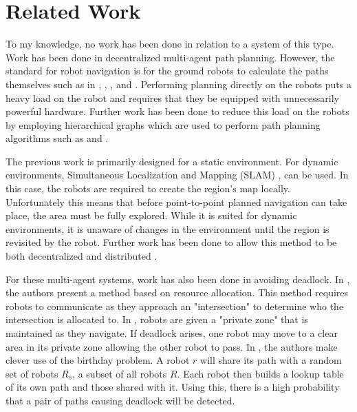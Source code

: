 \section{Related Work}
To my knowledge, no work has been done in relation to a system of this type. Work has been done in decentralized multi-agent path planning. However, the standard for robot navigation is for the ground robots to calculate the paths themselves such as in \cite{DeadlockDigani}, \cite{DeadlockDraganjac}, \cite{FTC-A}, and \cite{DecentralizedPlanningVelagapudi}. Performing planning directly on the robots puts a heavy load on the robot and requires that they be equipped with unnecessarily powerful hardware. Further work has been done to reduce this load on the robots by employing hierarchical graphs which are used to perform path planning algorithms such as \cite{FTC-A} and \cite{CTF-A}. 

The previous work is primarily designed for a static environment. For dynamic environments, Simultaneous Localization and Mapping (SLAM) \cite{SLAM}, can be used. In this case, the robots are required to create the region's map locally. Unfortunately this means that before point-to-point planned navigation can take place, the area must be fully explored. While it is suited for dynamic environments, it is unaware of changes in the environment until the region is revisited by the robot. Further work has been done to allow this method to be both decentralized and distributed \cite{DecentralizedSLAM}.

For these multi-agent systems, work has also been done in avoiding deadlock. In \cite{DeadlockDigani}, the authors present a method based on resource allocation. This method requires robots to communicate as they approach an "intersection" to determine who the intersection is allocated to. In \cite{DeadlockDraganjac}, robots are given a "private zone" that is maintained as they navigate. If deadlock arises, one robot may move to a clear area in its private zone allowing the other robot to pass. In \cite{DecentralizedPlanningVelagapudi}, the authors make clever use of the birthday problem. A robot $r$ will share its path with a random set of robots $R_s$, a subset of all robots $R$. Each robot then builds a lookup table of its own path and those shared with it. Using this, there is a high probability that a pair of paths causing deadlock will be detected.